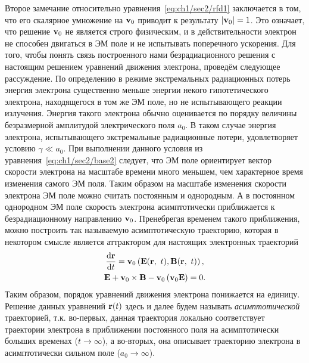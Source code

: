 Второе замечание относительно уравнения~\eqref{eq:ch1/sec2/rfd1} заключается в том, что его скалярное умножение на $\vb{v}_0$ приводит к результату $|\vb{v}_0|=1$.
Это означает, что решение $\vb{v}_0$ не является строго физическим, и в действительности электрон не способен двигаться в ЭМ поле и не испытывать поперечного ускорения.
Для того, чтобы понять связь построенного нами безрадиационного решения с настоящим решением уравнений движения электрона, проведём следующее рассуждение.
По определению в режиме экстремальных радиационных потерь энергия электрона существенно меньше энергии некого гипотетического электрона, находящегося в том же ЭМ поле, но не испытывающего реакции излучения.
Энергия такого электрона обычно оценивается по порядку величины безразмерной амплитудой электрического поля $a_0$.
В таком случае энергия электрона, испытывающего экстремальные радиационные потери, удовлетворяет условию $\gamma \ll a_0$.
При выполнении данного условия из уравнения~\eqref{eq:ch1/sec2/base2} следует, что ЭМ поле ориентирует вектор скорости электрона на масштабе времени много меньшем, чем характерное время изменения самого ЭМ поля.
Таким образом на масштабе изменения скорости электрона ЭМ поле можно считать постоянным и однородным.
А в постоянном однородном ЭМ поле скорость электрона асимптотически приближается к безрадиационному направлению $\vb{v}_0$.
Пренебрегая временем такого приближения, можно построить так называемую асимптотическую траекторию, которая в некотором смысле является аттрактором для настоящих электронных траекторий
\begin{gather}
    \label{eq:ch1/sec2/rfdr}
    \dv{\vb{r}}{t} = \vb{v}_0\left(\vb{E}(\vb{r},\ t), \vb{B}(\vb{r},\ t)\right), \\
    \label{eq:ch1/sec2/rfdv}
    \vb{E} + \vb{v}_0\times \vb{B} - \vb{v}_0\left( \vb{v}_0\vb{E} \right) = 0 .
\end{gather}
Таким образом, порядок уравнений движения электрона понижается на единицу.
Решение данных уравнений $\vb{r}(t)$ здесь и далее будем называть \textit{асимптотической} траекторией, т.к. во-первых, данная траектория локально соответствует траектории электрона в приближении постоянного поля на асимптотически больших временах ($t \to \infty$), а во-вторых, она описывает траекторию электрона в асимптотически сильном поле ($a_0 \to \infty$).


